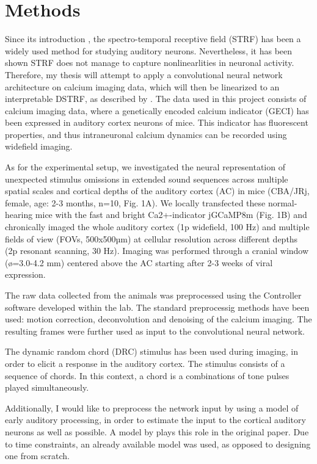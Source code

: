 \chapter{Methods}\label{methods}
Since its introduction \parencite{aertsenSpectrotemporalReceptiveFields1980a}, the spectro-temporal receptive field (STRF) has been a widely used method for studying auditory neurons. Nevertheless, it has been shown STRF does not manage to capture nonlinearlities in neuronal activity. Therefore, my thesis will attempt to apply a convolutional neural network architecture on calcium imaging data, which will then be linearized to an interpretable DSTRF, as described by \textcite{keshishianEstimatingInterpretingNonlinear2020}. 
The data used in this project consists of calcium imaging data, where a genetically encoded calcium indicator (GECI) has been expressed in auditory cortex neurons of mice. This indicator has fluorescent properties, and thus intraneuronal calcium dynamics can be recorded using widefield imaging.

As for the experimental setup, we investigated the neural representation of unexpected stimulus omissions in extended sound sequences across multiple spatial scales and cortical depths of the auditory cortex (AC) in mice (CBA/JRj, female, age: 2-3 months, n=10, Fig. 1A). We locally transfected these normal-hearing mice with the fast and bright Ca2+-indicator jGCaMP8m (Fig. 1B) and chronically imaged the whole auditory cortex (1p widefield, 100 Hz) and multiple fields of view (FOVs, 500x500µm) at cellular resolution across different depths (2p resonant scanning, 30 Hz). Imaging was performed through a cranial window (ø=3.0-4.2 mm) centered above the AC starting after 2-3 weeks of viral expression.

The raw data collected from the animals was preprocessed using the Controller software developed within the lab. The standard preprocessig methods have been used: motion correction, deconvolution and denoising of the calcium imaging. The resulting frames were further used as input to the convolutional neural network.

The dynamic random chord (DRC) stimulus has been used during imaging, in order to elicit a response in the auditory cortex. The stimulus consists of a sequence of chords. In this context, a chord is a combinations of tone pulses played simultaneously.

Additionally, I would like to preprocess the network input by using a model of early auditory processing, in order to estimate the input to the cortical auditory neurons as well as possible. A model by \textcite{yangAuditoryRepresentationsAcoustic1992} plays this role in the original paper. Due to time constraints, an already available model was used, as opposed to designing one from scratch.

